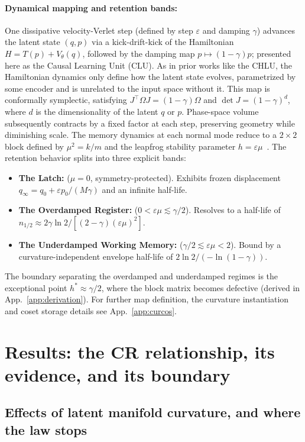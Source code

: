 \documentclass[mlabstract,onecolumn]{jmlr}
\begin{document}
\paragraph{Dynamical mapping and retention bands:} One dissipative velocity-Verlet step (defined by step $\varepsilon$ and damping $\gamma$) advances the latent state $(q,p)$ via a kick-drift-kick of the Hamiltonian $H=T(p)+V_\theta(q)$, followed by the damping map $p\mapsto(1-\gamma)p$; presented here as the Causal Learning Unit (CLU). As in prior works like the CHLU, the Hamiltonian dynamics only define how the latent state evolves, parametrized by some encoder and is unrelated to the input space without it. This map is conformally symplectic, satisfying $J^\top\Omega J=(1-\gamma)\Omega$ and $\det J=(1-\gamma)^d$, where $d$ is the dimensionality of the latent $q$ or $p$. Phase-space volume subsequently contracts by a fixed factor at each step, preserving geometry while diminishing scale. The memory dynamics at each normal mode reduce to a $2\times2$ block defined by $\mu^2=k/m$ and the leapfrog stability parameter $h=\varepsilon\mu$~\citep{hairer_geometric_2006}. The retention behavior splits into three explicit bands:
\begin{itemize}
    \item \textbf{The Latch:} ($\mu=0$, symmetry-protected). Exhibits frozen displacement $q_\infty=q_0+\varepsilon p_0/(M\gamma)$ and an infinite half-life.
    \item \textbf{The Overdamped Register:} ($0<\varepsilon\mu\lesssim\gamma/2$). Resolves to a half-life of $n_{1/2}\approx2\gamma\ln2/[(2-\gamma)(\varepsilon\mu)^2]$.
    \item \textbf{The Underdamped Working Memory:} ($\gamma/2\lesssim\varepsilon\mu<2$). Bound by a curvature-independent envelope half-life of $2\ln2/(-\ln(1-\gamma))$.
\end{itemize}
The boundary separating the overdamped and underdamped regimes is the exceptional point $h^*\approx\gamma/2$, where the block matrix becomes defective (derived in App.~\ref{app:derivation}). For further map definition, the curvature instantiation and coset storage details see App.~\ref{app:curcos}.

\section{Results: the CR relationship, its evidence, and its boundary}\label{sec:results}

\subsection{Effects of latent manifold curvature, and where the law stops}\label{sec:pricelist}
\end{document}
